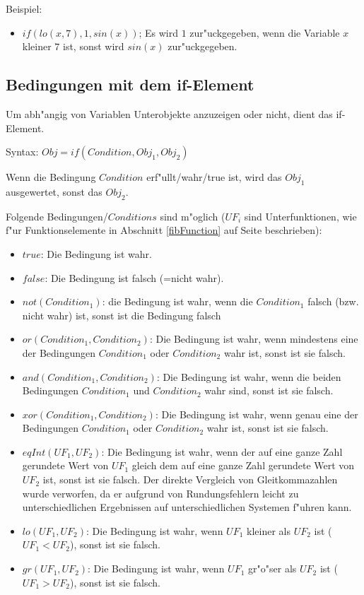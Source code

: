 \bigskip\noindent
Beispiel:
\begin{itemize}
 \item $if( lo(x, 7), 1, sin(x) )$; Es wird $1$ zur"uckgegeben, wenn die Variable $x$ kleiner $7$ ist, sonst wird $sin(x)$ zur"uckgegeben.
\end{itemize}




\subsection{Bedingungen mit dem if-Element}
\label{secFibIf}

Um abh"angig von Variablen Unterobjekte anzuzeigen oder nicht, dient das if-Element.

\bigskip\noindent
Syntax:
$Obj=if( Condition, Obj_1, Obj_2)$

Wenn die Bedingung $Condition$ erf"ullt/wahr/true ist, wird das $Obj_1$ ausgewertet, sonst das $Obj_2$.

\bigskip\noindent
Folgende Bedingungen/$Conditions$ sind m"oglich ($UF_i$ sind Unterfunktionen, wie f"ur Funktionselemente in Abschnitt \ref{fibFunction} auf Seite \pageref{fibFunction} beschrieben):
\begin{itemize}
 \item $true$: Die Bedingung ist wahr.
 \item $false$: Die Bedingung ist falsch (=nicht wahr).
 \item $not(Condition_1)$: die Bedingung ist wahr, wenn die $Condition_1$ falsch (bzw. nicht wahr) ist, sonst ist die Bedingung falsch
 \item $or( Condition_1, Condition_2)$: Die Bedingung ist wahr, wenn mindestens eine der Bedingungen $Condition_1$ oder $Condition_2$ wahr ist, sonst ist sie falsch.
 \item $and( Condition_1, Condition_2)$: Die Bedingung ist wahr, wenn die beiden Bedingungen $Condition_1$ und $Condition_2$ wahr sind, sonst ist sie falsch.
 \item $xor( Condition_1, Condition_2)$: Die Bedingung ist wahr, wenn genau eine der Bedingungen $Condition_1$ oder $Condition_2$ wahr ist, sonst ist sie falsch.

 \item $eqInt(UF_1,UF_2)$: Die Bedingung ist wahr, wenn der auf eine ganze Zahl gerundete Wert von $UF_1$ gleich dem auf eine ganze Zahl gerundete Wert von $UF_2$ ist, sonst ist sie falsch. Der direkte Vergleich von Gleitkommazahlen wurde verworfen, da er aufgrund von Rundungsfehlern leicht zu unterschiedlichen Ergebnissen auf unterschiedlichen Systemen f"uhren kann.
 \item $lo(UF_1,UF_2)$: Die Bedingung ist wahr, wenn $UF_1$ kleiner als $UF_2$ ist ($UF_1<UF_2$), sonst ist sie falsch.
 \item $gr(UF_1,UF_2)$: Die Bedingung ist wahr, wenn $UF_1$ gr"o"ser als $UF_2$ ist ($UF_1>UF_2$), sonst ist sie falsch.
\end{itemize}


